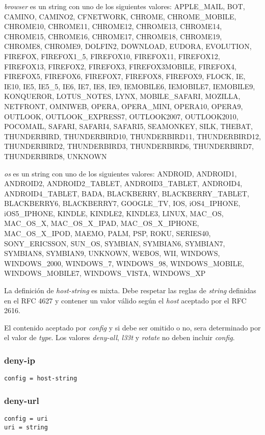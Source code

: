 \documentclass[11pt,a4paper,titlepage]{article}
\begin{document}
\textit{browser} es un string con uno de los siguientes valores:
APPLE\_MAIL, BOT, CAMINO, CAMINO2, CFNETWORK, CHROME, CHROME\_MOBILE, CHROME10, CHROME11, CHROME12, CHROME13, CHROME14, CHROME15, CHROME16, CHROME17, CHROME18, CHROME19, CHROME8, CHROME9, DOLFIN2, DOWNLOAD, EUDORA, EVOLUTION, FIREFOX, FIREFOX1\_5, FIREFOX10, FIREFOX11, FIREFOX12, FIREFOX13, FIREFOX2, FIREFOX3, FIREFOX3MOBILE, FIREFOX4, FIREFOX5, FIREFOX6, FIREFOX7, FIREFOX8, FIREFOX9, FLOCK, IE, IE10, IE5, IE5\_5, IE6, IE7, IE8, IE9, IEMOBILE6, IEMOBILE7, IEMOBILE9, KONQUEROR, LOTUS\_NOTES, LYNX, MOBILE\_SAFARI, MOZILLA, NETFRONT, OMNIWEB, OPERA, OPERA\_MINI, OPERA10, OPERA9, OUTLOOK, OUTLOOK\_EXPRESS7, OUTLOOK2007, OUTLOOK2010, POCOMAIL, SAFARI, SAFARI4, SAFARI5, SEAMONKEY, SILK, THEBAT, THUNDERBIRD, THUNDERBIRD10, THUNDERBIRD11, THUNDERBIRD12, THUNDERBIRD2, THUNDERBIRD3, THUNDERBIRD6, THUNDERBIRD7, THUNDERBIRD8, UNKNOWN

\textit{os} es un string con uno de los siguientes valores:
ANDROID, ANDROID1, ANDROID2, ANDROID2\_TABLET, ANDROID3\_TABLET, ANDROID4, ANDROID4\_TABLET, BADA, BLACKBERRY, BLACKBERRY\_TABLET, BLACKBERRY6, BLACKBERRY7, GOOGLE\_TV, IOS, iOS4\_IPHONE, iOS5\_IPHONE, KINDLE, KINDLE2, KINDLE3, LINUX, MAC\_OS, MAC\_OS\_X, MAC\_OS\_X\_IPAD, MAC\_OS\_X\_IPHONE, MAC\_OS\_X\_IPOD, MAEMO, PALM, PSP, ROKU, SERIES40, SONY\_ERICSSON, SUN\_OS, SYMBIAN, SYMBIAN6, SYMBIAN7, SYMBIAN8, SYMBIAN9, UNKNOWN, WEBOS, WII, WINDOWS, WINDOWS\_2000, WINDOWS\_7, WINDOWS\_98, WINDOWS\_MOBILE, WINDOWS\_MOBILE7, WINDOWS\_VISTA, WINDOWS\_XP



La definición de \textit{host-string} es mixta.
Debe respetar las reglas de \textit{string} definidas en el RFC 4627 y contener un valor válido según el \textit{host} aceptado por el RFC 2616.

El contenido aceptado por \textit{config} y si debe ser omitido o no, sera determinado por el valor de \textit{type}.
Los valores \textit{deny-all}, \textit{l33t} y \textit{rotate} no deben incluir \textit{config}.
\subsubsection{deny-ip}
\begin{verbatim}
config = host-string
\end{verbatim}

\subsubsection{deny-url}
\begin{verbatim}
config = uri
uri = string
\end{verbatim}
\end{document}

